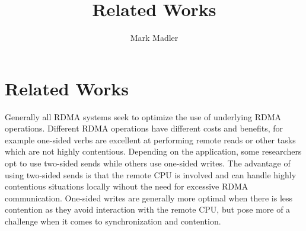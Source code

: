 \documentclass[sigplan,nonacm]{acmart}
\title{Related Works}
\author{Mark Madler}
\begin{document}
\maketitle
\section{Related Works}
Generally all RDMA systems seek to optimize the use of underlying RDMA operations.
Different RDMA operations have different costs and benefits, for example one-sided verbs
are excellent at performing remote reads or other tasks which are not highly contentious. 
Depending on the application, some researchers opt to use two-sided sends while others
use one-sided writes. The advantage of using two-sided sends is that the remote CPU is 
involved and can handle highly contentious situations locally wihout the need for 
excessive RDMA communication. One-sided writes are generally more optimal when there 
is less contention as they avoid interaction with the remote CPU, but pose more of a challenge
when it comes to synchronization and contention.

\end{document}
